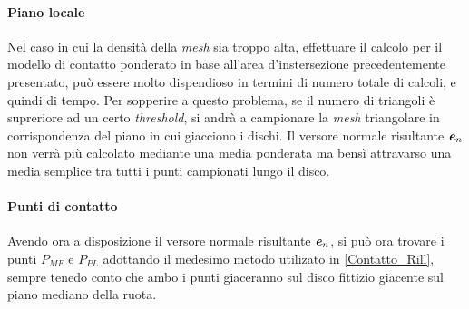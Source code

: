 \paragraph{Piano locale}
Nel caso in cui la densità della \textit{mesh} sia troppo alta, effettuare il calcolo per il modello di contatto ponderato in base all'area d'instersezione precedentemente presentato, può essere molto dispendioso in termini di numero totale di calcoli, e quindi di tempo. Per sopperire a questo problema, se il numero di triangoli è supreriore ad un certo \textit{threshold}, si andrà a campionare la \textit{mesh} triangolare in corrispondenza del piano in cui giacciono i dischi. Il versore normale risultante $\textbf{\textit{e}}_n$ non verrà più calcolato mediante una media ponderata ma bensì attravarso una media semplice tra tutti i punti campionati lungo il disco.

\paragraph{Punti di contatto}
Avendo ora a disposizione il versore normale risultante $\textbf{\textit{e}}_n$, si può ora trovare i punti $P_{MF}$ e $P_{PL}$ adottando il medesimo metodo utilizato in \ref{Contatto_Rill}, sempre tenedo conto che ambo i punti giaceranno sul disco fittizio giacente sul piano mediano della ruota. 

